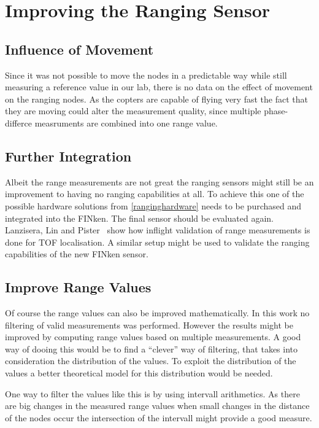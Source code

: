 \section{Improving the Ranging Sensor}
\subsection{Influence of Movement}
Since it was not possible to move the nodes in a predictable way while still measuring a reference value in our lab, there is no data on the effect of movement on the ranging nodes.
As the copters are capable of flying very fast the fact that they are moving could alter the measurement quality, since multiple phase-differce measruments are combined into one range value.

\subsection{Further Integration}

Albeit the range measurements are not great the ranging sensors might still be an improvement to having no ranging capabilities at all.
To achieve this one of the possible hardware solutions from \autoref{ranginghardware} needs to be purchased and integrated into the FINken.
The final sensor should be evaluated again.
Lanzisera, Lin and Pister~\cite{lanzisera2006} show how inflight validation of range measurements is done for TOF localisation.
A similar setup might be used to validate the ranging capabilities of the new FINken sensor.

\subsection{Improve Range Values}

Of course the range values can also be improved mathematically.
In this work no filtering of valid measurements was performed.
However the results might be improved by computing range values based on multiple measurements.
A good way of dooing this would be to find a “clever” way of filtering, that takes into consideration the distribution of the values.
To exploit the distribution of the values a better theoretical model for this distribution would be needed.

One way to filter the values like this is by using intervall arithmetics.
As there are big changes in the measured range values when small changes in the distance of the nodes occur the intersection of the intervall might provide a good measure.

